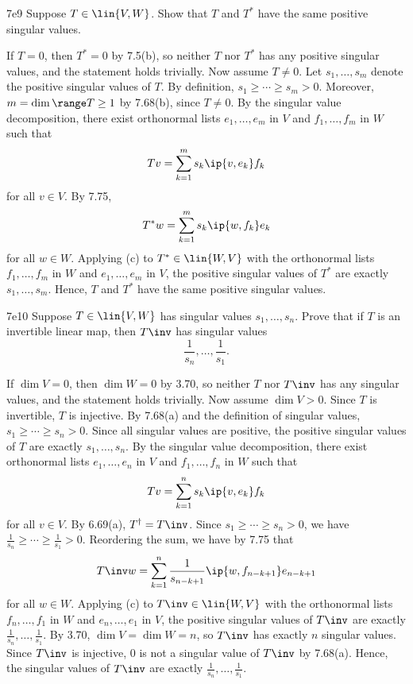 \begin{exercise}{7e9}
    Suppose $T \in \lin{V, W}$.
    Show that $T$ and $T^\ast$ have the same positive singular values.
\end{exercise}

\begin{sol}
    If $T = 0$, then $T^\ast = 0$ by 7.5(b), so neither $T$ nor $T^\ast$ has any positive singular values, and the statement holds trivially.
    Now assume $T \neq 0$.
    Let $s_1, \ldots, s_m$ denote the positive singular values of $T$.
    By definition, $s_1 \geq \cdots \geq s_m > 0$.
    Moreover, $m = \dim \range T \geq 1$ by 7.68(b), since $T \neq 0$.
    By the singular value decomposition, there exist orthonormal lists $e_1, \ldots, e_m$ in $V$ and $f_1, \ldots, f_m$ in $W$ such that
    \[
        T v = \sum_{k=1}^m s_k \ip{v, e_k} f_k
    \]
    for all $v \in V$.
    By 7.75,
    \[
        T^\ast w = \sum_{k=1}^m s_k \ip{w, f_k} e_k
    \]
    for all $w \in W$.
    Applying (c) to $T^\ast \in \lin{W, V}$ with the orthonormal lists $f_1, \ldots, f_m$ in $W$ and $e_1, \ldots, e_m$ in $V$, the positive singular values of $T^\ast$ are exactly $s_1, \ldots, s_m$.
    Hence, $T$ and $T^\ast$ have the same positive singular values.
\end{sol}

\begin{exercise}{7e10}
    Suppose $T \in \lin{V, W}$ has singular values $s_1, \ldots, s_n$.
    Prove that if $T$ is an invertible linear map, then $T\inv$ has singular values
    \[
        \frac{1}{s_n}, \ldots, \frac{1}{s_1}.
    \]
\end{exercise}

\begin{sol}
    If $\dim V = 0$, then $\dim W = 0$ by 3.70, so neither $T$ nor $T\inv$ has any singular values, and the statement holds trivially.
    Now assume $\dim V > 0$.
    Since $T$ is invertible, $T$ is injective.
    By 7.68(a) and the definition of singular values, $s_1 \geq \cdots \geq s_n > 0$.
    Since all singular values are positive, the positive singular values of $T$ are exactly $s_1, \ldots, s_n$.
    By the singular value decomposition, there exist orthonormal lists $e_1, \ldots, e_n$ in $V$ and $f_1, \ldots, f_n$ in $W$ such that
    \[
        T v = \sum_{k=1}^n s_k \ip{v, e_k} f_k
    \]
    for all $v \in V$.
    By 6.69(a), $T^\dagger = T\inv$.
    Since $s_1 \geq \cdots \geq s_n > 0$, we have $\frac{1}{s_n} \geq \cdots \geq \frac{1}{s_1} > 0$.
    Reordering the sum, we have by 7.75 that
    \[
        T\inv w = \sum_{k=1}^n \frac{1}{s_{n-k+1}} \ip{w, f_{n-k+1}} e_{n-k+1}
    \]
    for all $w \in W$.
    Applying (c) to $T\inv \in \lin{W, V}$ with the orthonormal lists $f_n, \ldots, f_1$ in $W$ and $e_n, \ldots, e_1$ in $V$, the positive singular values of $T\inv$ are exactly $\frac{1}{s_n}, \ldots, \frac{1}{s_1}$.
    By 3.70, $\dim V = \dim W = n$, so $T\inv$ has exactly $n$ singular values.
    Since $T\inv$ is injective, $0$ is not a singular value of $T\inv$ by 7.68(a).
    Hence, the singular values of $T\inv$ are exactly $\frac{1}{s_n}, \ldots, \frac{1}{s_1}$.
\end{sol}

